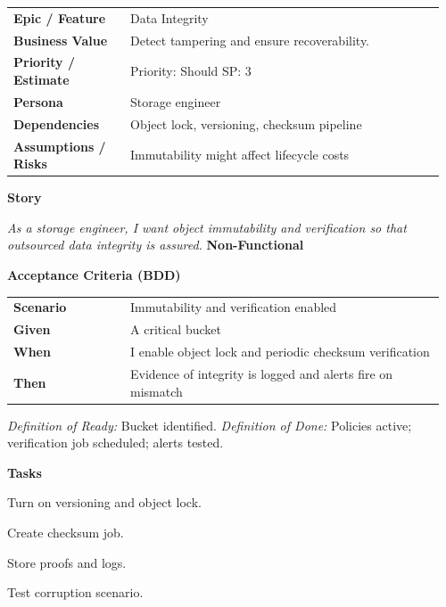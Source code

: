 \documentclass[11pt,letterpaper]{article}
\makeatletter
\newenvironment{kvtable}{%
  \begin{tabular}{@{}>{\bfseries\arraybackslash}p{0.26\linewidth} p{0.70\linewidth}@{}}
}{\end{tabular}}
\newenvironment{bdd}{%
  \begin{tabular}{@{}>{\bfseries\arraybackslash}p{0.26\linewidth} p{0.70\linewidth}@{}}
}{\end{tabular}}
\newcommand{\DoRDoD}[2]{%
  \vspace{0.35em}
  {\footnotesize\color{Muted}%
    \textit{Definition of Ready:} #1 \; \textbullet\;
    \textit{Definition of Done:} #2%
  }%
}
\newenvironment{storycard}[2]{%
  \begin{tcolorbox}[cloudcard, title={#1 --- #2}]%
}{\end{tcolorbox}}
\newcommand{\sectionlabel}[1]{\vspace{0.35em}\textbf{#1}\par}
\makeatother
\begin{document}
\begin{storycard}{CCS-21}{Ch. 21 — Integrity Assurance for Data Outsourcing}
\begin{kvtable}
Epic / Feature & Data Integrity\\
Business Value & Detect tampering and ensure recoverability.\\
Priority / Estimate & Priority: Should \quad SP: 3\\
Persona & Storage engineer\\
Dependencies & Object lock, versioning, checksum pipeline\\
Assumptions / Risks & Immutability might affect lifecycle costs\\
\end{kvtable}
\sectionlabel{Story}
\textit{As a storage engineer, I want object immutability and verification so that outsourced data integrity is assured.}
\sectionlabel{Non-Functional}\;
\sectionlabel{Acceptance Criteria (BDD)}
\begin{bdd}
Scenario & Immutability and verification enabled\\
Given & A critical bucket\\
When & I enable object lock and periodic checksum verification\\
Then & Evidence of integrity is logged and alerts fire on mismatch\\
\end{bdd}
\DoRDoD{Bucket identified.}{Policies active; verification job scheduled; alerts tested.}
\sectionlabel{Tasks}
\begin{checklist}
\item Turn on versioning and object lock.
\item Create checksum job.
\item Store proofs and logs.
\item Test corruption scenario.
\end{checklist}
\end{storycard}
\end{document}
